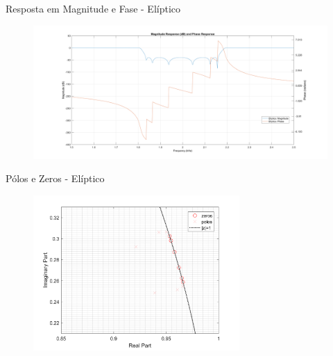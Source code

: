 \begin{frame}{Resposta em Magnitude e Fase - Elíptico}
    \begin{figure}
        \centering
        \includegraphics[width=1.1\textwidth]{graficos/mag_pha_e.png}
    \end{figure}
\end{frame}

\begin{frame}{Pólos e Zeros - Elíptico}
    \begin{figure}
        \centering
        \includegraphics[width=0.7\textwidth]{graficos/zp_e.png}
    \end{figure}
\end{frame}

